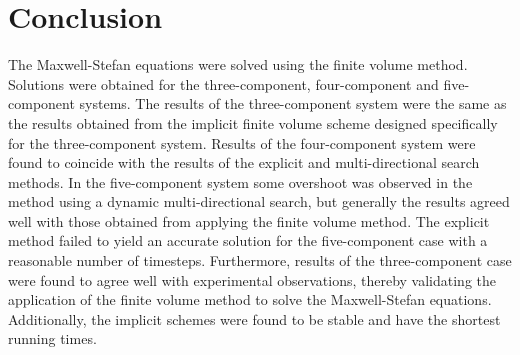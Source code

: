 \documentclass[11]{Report}
\begin{document}
\section*{Conclusion}
The Maxwell-Stefan equations were solved using the finite volume method. Solutions were obtained for the three-component, four-component and five-component systems. The results of the three-component system were the same as the results obtained from the implicit finite volume scheme designed specifically for the three-component system. Results of the four-component system were found to coincide with the results of the explicit and multi-directional search methods. In the five-component system some overshoot was observed in the method using a dynamic multi-directional search, but generally the results agreed well with those obtained from applying the finite volume method. The explicit method failed to yield an accurate solution for the five-component case with a reasonable number of timesteps. Furthermore, results of the three-component case were found to agree well with experimental observations, thereby validating the application of the finite volume method to solve the Maxwell-Stefan equations. Additionally, the implicit schemes were found to be stable and have the shortest running times.
\end{document}
